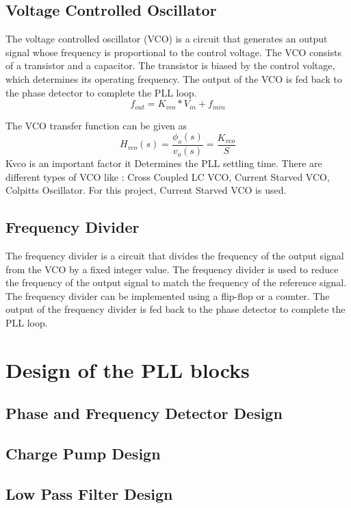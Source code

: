 \subsection{Voltage Controlled Oscillator}
The voltage controlled oscillator (VCO) is a circuit that generates an output signal whose frequency is proportional to the control voltage. The VCO consists of a transistor and a capacitor. The transistor is biased by the control voltage, which determines its operating frequency. The output of the VCO is fed back to the phase detector to complete the PLL loop.
\begin{equation}
	\label{eq:vco_char}
	f_{out} = K_{vco} * V_{in} + f_{min}
\end{equation}

The VCO transfer function can be given as
\begin{equation}
	\label{eq:vco_tf}
	H_{vco}(s) = \frac{\phi_{o}(s)}{v_{o}(s)} = \frac{K_{vco}}{S}
\end{equation}
Kvco is an important factor it Determines the PLL settling time.
There are different types of VCO like : Cross Coupled LC VCO, Current Starved VCO, Colpitts Oscillator. For this project, Current Starved VCO is used.
\subsection{Frequency Divider}
The frequency divider is a circuit that divides the frequency of the output signal from the VCO by a fixed integer value. The frequency divider is used to reduce the frequency of the output signal to match the frequency of the reference signal. The frequency divider can be implemented using a flip-flop or a counter. The output of the frequency divider is fed back to the phase detector to complete the PLL loop.
\section{Design of the PLL blocks}
\subsection{Phase and Frequency Detector Design}
\subsection{Charge Pump Design}
\subsection{Low Pass Filter Design}

